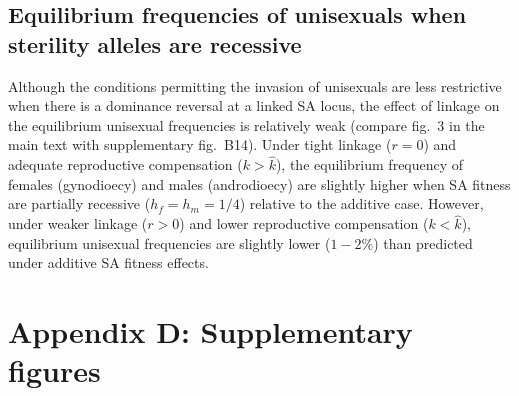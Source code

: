 \documentclass{article}
\begin{document}
\subsection*{Equilibrium frequencies of unisexuals when sterility alleles are recessive}
Although the conditions permitting the invasion of unisexuals are less restrictive when there is a dominance reversal at a linked SA locus, the effect of linkage on the equilibrium unisexual frequencies is relatively weak (compare fig.~3 in the main text with supplementary fig.~B14). Under tight linkage ($r = 0$) and adequate reproductive compensation ($k > \hat{k}$), the equilibrium frequency of females (gynodioecy) and males (androdioecy) are slightly higher when SA fitness are partially recessive ($h_f = h_m = 1/4$) relative to the additive case. However, under weaker linkage ($r > 0$) and lower reproductive compensation ($k < \hat{k}$), equilibrium unisexual frequencies are slightly lower ($1 - 2 \%$) than predicted under additive SA fitness effects.

\newpage{}


\section*{Appendix D: Supplementary figures}
\renewcommand{\theequation}{D\arabic{equation}}
\setcounter{equation}{0}
\renewcommand{\thefigure}{D\arabic{figure}}
\setcounter{figure}{0}
\end{document}

